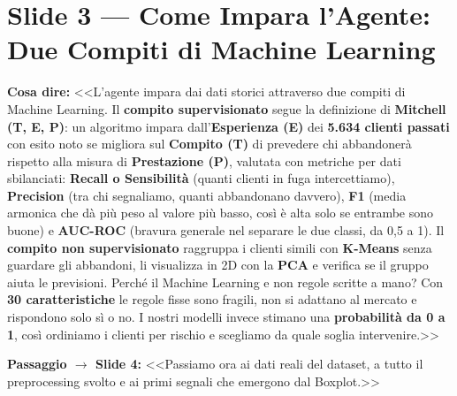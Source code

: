 \documentclass[10pt, a4paper]{article}
\newcommand{\say}[1]{%
  \par\vspace{2pt}\noindent\colorbox{SoftBox}{\parbox{\dimexpr\linewidth-2\fboxsep}{\raggedright\small\textbf{\color{PrimaryNavy}Cosa dire:} #1}}\par\vspace{2pt}%
}
\newcommand{\pass}[2]{%
  \par\vspace{1pt}\noindent\colorbox{PassBox}{\parbox{\dimexpr\linewidth-2\fboxsep}{\raggedright\footnotesize\textbf{\color{AccentAmber}Passaggio $\rightarrow$ Slide #1:} <<#2>>}}\par%
}
\newcommand{\slideblock}[3]{%
  \noindent\begin{minipage}{\linewidth}
    \section*{#1}
    \say{#2}
    #3
  \end{minipage}\par\vspace{6pt}%
}
\begin{document}
\slideblock{Slide 3 --- Come Impara l'Agente: Due Compiti di Machine Learning}{%
<<L'agente impara dai dati storici attraverso due compiti di Machine Learning. Il \textbf{compito supervisionato} segue la definizione di \textbf{Mitchell (T, E, P)}: un algoritmo impara dall'\textbf{Esperienza (E)} dei \textbf{5.634 clienti passati} con esito noto se migliora sul \textbf{Compito (T)} di prevedere chi abbandonerà rispetto alla misura di \textbf{Prestazione (P)}, valutata con metriche per dati sbilanciati: \textbf{Recall o Sensibilità} (quanti clienti in fuga intercettiamo), \textbf{Precision} (tra chi segnaliamo, quanti abbandonano davvero), \textbf{F1} (media armonica che dà più peso al valore più basso, così è alta solo se entrambe sono buone) e \textbf{AUC-ROC} (bravura generale nel separare le due classi, da 0,5 a 1). Il \textbf{compito non supervisionato} raggruppa i clienti simili con \textbf{K-Means} senza guardare gli abbandoni, li visualizza in 2D con la \textbf{PCA} e verifica se il gruppo aiuta le previsioni. Perché il Machine Learning e non regole scritte a mano? Con \textbf{30 caratteristiche} le regole fisse sono fragili, non si adattano al mercato e rispondono solo sì o no. I nostri modelli invece stimano una \textbf{probabilità da 0 a 1}, così ordiniamo i clienti per rischio e scegliamo da quale soglia intervenire.>>%
}{\pass{4}{Passiamo ora ai dati reali del dataset, a tutto il preprocessing svolto e ai primi segnali che emergono dal Boxplot.}}
\end{document}

